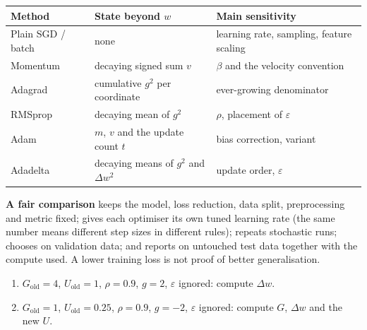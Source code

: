 \documentclass[11pt]{article}
\begin{document}
\begin{worked}
\small
\begin{tabular}{@{}lll@{}}
\toprule
\textbf{Method} & \textbf{State beyond $w$} & \textbf{Main sensitivity}\\ \midrule
Plain SGD / batch & none & learning rate, sampling, feature scaling\\
Momentum & decaying signed sum $v$ & $\beta$ and the velocity convention\\
Adagrad & cumulative $g^2$ per coordinate & ever-growing denominator\\
RMSprop & decaying mean of $g^2$ & $\rho$, placement of $\varepsilon$\\
Adam & $m$, $v$ and the update count $t$ & bias correction, variant\\
Adadelta & decaying means of $g^2$ and $\Delta w^2$ & update order, $\varepsilon$\\
\bottomrule
\end{tabular}

\normalsize
\textbf{A fair comparison} keeps the model, loss reduction, data split,
preprocessing and metric fixed; gives each optimiser its own tuned learning
rate (the same number means different step sizes in different rules);
repeats stochastic runs; chooses on validation data; and reports on untouched
test data together with the compute used. A lower training loss is not proof
of better generalisation.
\end{worked}

\begin{tryit}
\begin{enumerate}[label=\textbf{E8.\arabic*}]
  \item $G_{\text{old}} = 4$, $U_{\text{old}} = 1$, $\rho = 0.9$, $g = 2$,
    $\varepsilon$ ignored: compute $\Delta w$.
  \item $G_{\text{old}} = 1$, $U_{\text{old}} = 0.25$, $\rho = 0.9$, $g = -2$,
    $\varepsilon$ ignored: compute $G$, $\Delta w$ and the new $U$.
\end{enumerate}
\end{tryit}
\end{document}
